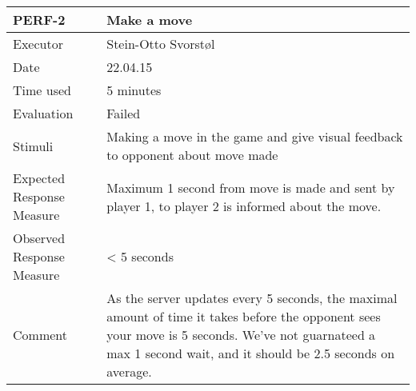 \begin{table}[H]
\begin{tabular}{|l|p{10cm}|}
\hline
\textbf{PERF-2} & Make a move \\ \hline
Executor    & Stein-Otto Svorstøl            \\ \hline
Date        & 22.04.15         \\ \hline
Time used   & 5 minutes            \\ \hline
Evaluation  &  Failed          \\ \hline
Stimuli     &  Making a move in the game and give visual feedback to opponent about move made           \\ \hline
Expected Response Measure & Maximum 1 second from move is made and sent by player 1, to player 2 is informed about the move. \\ \hline
Observed Response Measure & < 5 seconds        \\ \hline
Comment     & As the server updates every 5 seconds, the maximal amount of time it takes before the opponent sees your move is 5 seconds. We've not guarnateed a max 1 second wait, and it should be 2.5 seconds on average.         \\ \hline
\end{tabular}
\end{table}